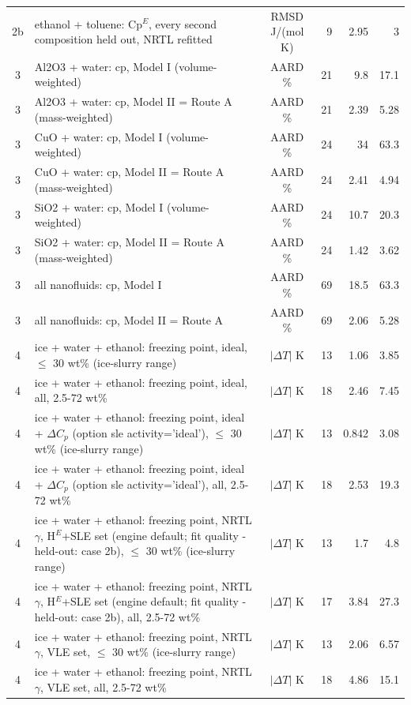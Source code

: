 \begin{tabular}{c p{8.6cm} c r r r}
2b & ethanol + toluene: Cp$^E$, every second composition held out, NRTL refitted & RMSD J/(mol K) & 9 & 2.95 & 3 \\
3 & Al2O3 + water: cp, Model I (volume-weighted) & AARD \% & 21 & 9.8 & 17.1 \\
3 & Al2O3 + water: cp, Model II = Route A (mass-weighted) & AARD \% & 21 & 2.39 & 5.28 \\
3 & CuO + water: cp, Model I (volume-weighted) & AARD \% & 24 & 34 & 63.3 \\
3 & CuO + water: cp, Model II = Route A (mass-weighted) & AARD \% & 24 & 2.41 & 4.94 \\
3 & SiO2 + water: cp, Model I (volume-weighted) & AARD \% & 24 & 10.7 & 20.3 \\
3 & SiO2 + water: cp, Model II = Route A (mass-weighted) & AARD \% & 24 & 1.42 & 3.62 \\
3 & all nanofluids: cp, Model I & AARD \% & 69 & 18.5 & 63.3 \\
3 & all nanofluids: cp, Model II = Route A & AARD \% & 69 & 2.06 & 5.28 \\
4 & ice + water + ethanol: freezing point, ideal, $\le$ 30 wt\% (ice-slurry range) & $|\Delta T|$ K & 13 & 1.06 & 3.85 \\
4 & ice + water + ethanol: freezing point, ideal, all, 2.5-72 wt\% & $|\Delta T|$ K & 18 & 2.46 & 7.45 \\
4 & ice + water + ethanol: freezing point, ideal + $\Delta C_p$ (option sle activity='ideal'), $\le$ 30 wt\% (ice-slurry range) & $|\Delta T|$ K & 13 & 0.842 & 3.08 \\
4 & ice + water + ethanol: freezing point, ideal + $\Delta C_p$ (option sle activity='ideal'), all, 2.5-72 wt\% & $|\Delta T|$ K & 18 & 2.53 & 19.3 \\
4 & ice + water + ethanol: freezing point, NRTL $\gamma$, H$^E$+SLE set (engine default; fit quality - held-out: case 2b), $\le$ 30 wt\% (ice-slurry range) & $|\Delta T|$ K & 13 & 1.7 & 4.8 \\
4 & ice + water + ethanol: freezing point, NRTL $\gamma$, H$^E$+SLE set (engine default; fit quality - held-out: case 2b), all, 2.5-72 wt\% & $|\Delta T|$ K & 17 & 3.84 & 27.3 \\
4 & ice + water + ethanol: freezing point, NRTL $\gamma$, VLE set, $\le$ 30 wt\% (ice-slurry range) & $|\Delta T|$ K & 13 & 2.06 & 6.57 \\
4 & ice + water + ethanol: freezing point, NRTL $\gamma$, VLE set, all, 2.5-72 wt\% & $|\Delta T|$ K & 18 & 4.86 & 15.1 \\

\end{tabular}
